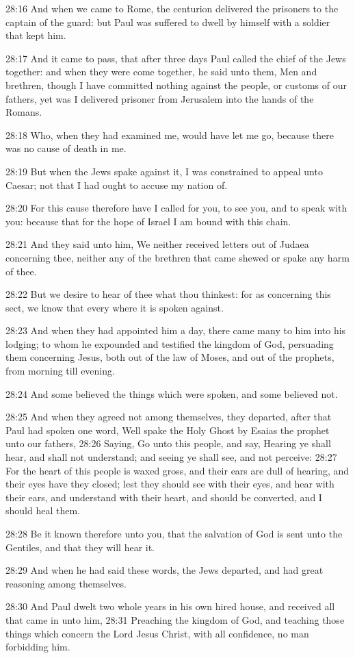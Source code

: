 28:16 And when we came to Rome, the centurion delivered the prisoners
to the captain of the guard: but Paul was suffered to dwell by himself
with a soldier that kept him.

28:17 And it came to pass, that after three days Paul called the chief
of the Jews together: and when they were come together, he said unto
them, Men and brethren, though I have committed nothing against the
people, or customs of our fathers, yet was I delivered prisoner from
Jerusalem into the hands of the Romans.

28:18 Who, when they had examined me, would have let me go, because
there was no cause of death in me.

28:19 But when the Jews spake against it, I was constrained to appeal
unto Caesar; not that I had ought to accuse my nation of.

28:20 For this cause therefore have I called for you, to see you, and
to speak with you: because that for the hope of Israel I am bound with
this chain.

28:21 And they said unto him, We neither received letters out of
Judaea concerning thee, neither any of the brethren that came shewed
or spake any harm of thee.

28:22 But we desire to hear of thee what thou thinkest: for as
concerning this sect, we know that every where it is spoken against.

28:23 And when they had appointed him a day, there came many to him
into his lodging; to whom he expounded and testified the kingdom of
God, persuading them concerning Jesus, both out of the law of Moses,
and out of the prophets, from morning till evening.

28:24 And some believed the things which were spoken, and some
believed not.

28:25 And when they agreed not among themselves, they departed, after
that Paul had spoken one word, Well spake the Holy Ghost by Esaias the
prophet unto our fathers, 28:26 Saying, Go unto this people, and say,
Hearing ye shall hear, and shall not understand; and seeing ye shall
see, and not perceive: 28:27 For the heart of this people is waxed
gross, and their ears are dull of hearing, and their eyes have they
closed; lest they should see with their eyes, and hear with their
ears, and understand with their heart, and should be converted, and I
should heal them.

28:28 Be it known therefore unto you, that the salvation of God is
sent unto the Gentiles, and that they will hear it.

28:29 And when he had said these words, the Jews departed, and had
great reasoning among themselves.

28:30 And Paul dwelt two whole years in his own hired house, and
received all that came in unto him, 28:31 Preaching the kingdom of
God, and teaching those things which concern the Lord Jesus Christ,
with all confidence, no man forbidding him.

